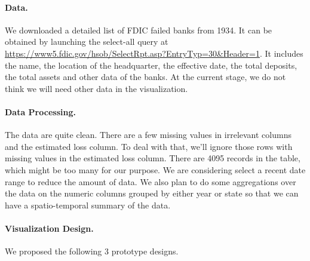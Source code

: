 \documentclass[11pt]{article}
\begin{document}
\paragraph{Data.}
We downloaded a detailed list of FDIC failed banks from 1934. It can be
obtained by launching the select-all query at
\url{https://www5.fdic.gov/hsob/SelectRpt.asp?EntryTyp=30&Header=1}. It
includes the name, the location of the headquarter, the effective date, the
total deposits, the total assets and other data of the banks. At the current
stage, we do not think we will need other data in the visualization.

\paragraph{Data Processing.}
The data are quite clean. There are a few missing values in irrelevant columns
and the estimated loss column. To deal with that, we'll ignore those rows with
missing values in the estimated loss column. There are 4095 records in the
table, which might be too many for our purpose. We are considering select a
recent date range to reduce the amount of data. We also plan to do some
aggregations over the data on the numeric columns grouped by either year or
state so that we can have a spatio-temporal summary of the data.

\paragraph{Visualization Design.} We proposed the following 3 prototype designs.
\end{document}
